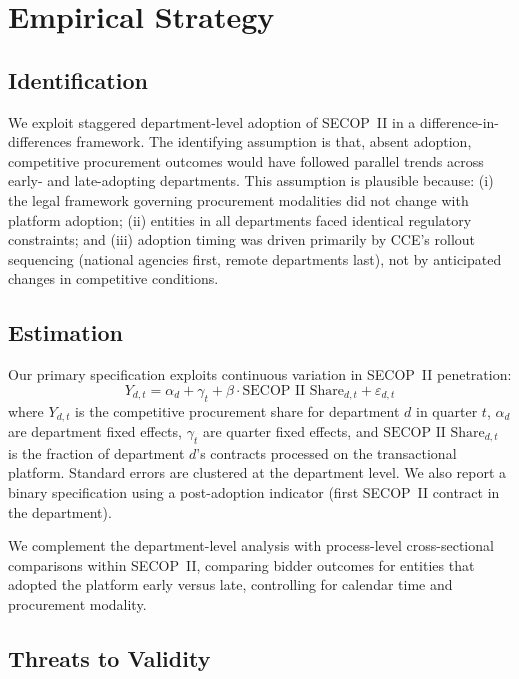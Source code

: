 \documentclass[12pt]{article}
\begin{document}
\section{Empirical Strategy}
\label{sec:strategy}

\subsection{Identification}

We exploit staggered department-level adoption of SECOP~II in a difference-in-differences framework. The identifying assumption is that, absent adoption, competitive procurement outcomes would have followed parallel trends across early- and late-adopting departments. This assumption is plausible because: (i) the legal framework governing procurement modalities did not change with platform adoption; (ii) entities in all departments faced identical regulatory constraints; and (iii) adoption timing was driven primarily by CCE's rollout sequencing (national agencies first, remote departments last), not by anticipated changes in competitive conditions.

\subsection{Estimation}

Our primary specification exploits continuous variation in SECOP~II penetration:
\begin{equation}
Y_{d,t} = \alpha_d + \gamma_t + \beta \cdot \text{SECOP~II~Share}_{d,t} + \varepsilon_{d,t}
\label{eq:twfe}
\end{equation}
where $Y_{d,t}$ is the competitive procurement share for department $d$ in quarter $t$, $\alpha_d$ are department fixed effects, $\gamma_t$ are quarter fixed effects, and $\text{SECOP~II~Share}_{d,t}$ is the fraction of department $d$'s contracts processed on the transactional platform. Standard errors are clustered at the department level. We also report a binary specification using a post-adoption indicator (first SECOP~II contract in the department).

We complement the department-level analysis with process-level cross-sectional comparisons within SECOP~II, comparing bidder outcomes for entities that adopted the platform early versus late, controlling for calendar time and procurement modality.

\subsection{Threats to Validity}
\end{document}
